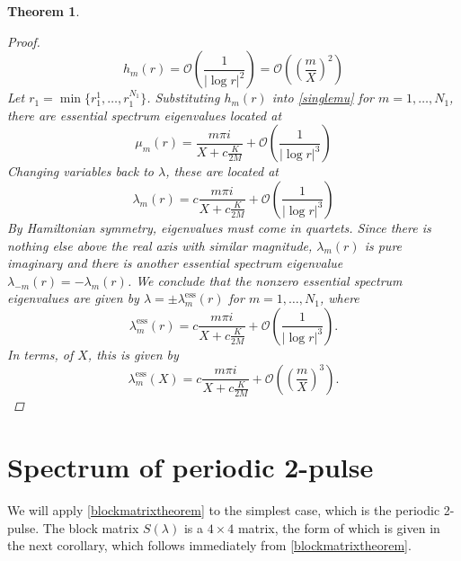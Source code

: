 \documentclass[11pt,reqno]{amsart}
\theoremstyle{plain}
\newtheorem{theorem}{Theorem}
\theoremstyle{definition}
\theoremstyle{remark}
\begin{document}
\begin{theorem}
\begin{proof}
\[
h_m(r) = \mathcal{O}\left( \frac{1}{|\log r|^2} \right) = \mathcal{O}\left( \left(\frac{m}{X}\right)^2 \right)
\]
Let $r_1 = \min\{ r_1^1, \dots, r_1^{N_1} \}$. Substituting $h_m(r)$ into \cref{singlemu} for $m = 1, \dots, N_1$, there are essential spectrum eigenvalues located at
\[
\mu_m(r) = \frac{m \pi i}{X + c \frac{K}{2 M}} + \mathcal{O}\left( \frac{1}{|\log r|^3} \right)
\]
Changing variables back to $\lambda$, these are located at
\[
\lambda_m(r) = c  \frac{m \pi i}{X + c \frac{K}{2 M}} + \mathcal{O}\left( \frac{1}{|\log r|^3} \right)
\]
By Hamiltonian symmetry, eigenvalues must come in quartets. Since there is nothing else above the real axis with similar magnitude, $\lambda_m(r)$ is pure imaginary and there is another essential spectrum eigenvalue $\lambda_{-m}(r) = -\lambda_m(r)$. We conclude that the nonzero essential spectrum eigenvalues are given by $\lambda = \pm \lambda_m^{\text{ess}}(r)$ for $m = 1, \dots, N_1$, where
\[
\lambda_m^{\text{ess}}(r) = c  \frac{m \pi i}{X + c \frac{K}{2 M}} + \mathcal{O}\left( \frac{1}{|\log r|^3} \right).
\]
In terms, of $X$, this is given by
\[
\lambda_m^{\text{ess}}(X) = c  \frac{m \pi i}{X + c \frac{K}{2 M}} + \mathcal{O}\left( \left(\frac{m}{X}\right)^3\right).
\]
\end{proof}
\end{theorem}




\section{Spectrum of periodic 2-pulse}\label{sec:per2peig}

We will apply \cref{blockmatrixtheorem} to the simplest case, which is the periodic 2-pulse. The block matrix $S(\lambda)$ is a $4\times 4$ matrix, the form of which is given in the next corollary, which follows immediately from \cref{blockmatrixtheorem}.
\end{document}

